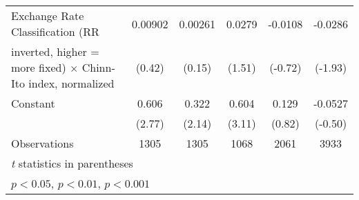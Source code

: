 \begin{table}[htbp]
\begin{tabular}{l*{5}{c}}
Exchange Rate Classification (RR        &  0.00902         &  0.00261         &   0.0279         &  -0.0108         &  -0.0286         \\
inverted, higher = more fixed) $\times$ Chinn-Ito index, normalized&   (0.42)         &   (0.15)         &   (1.51)         &  (-0.72)         &  (-1.93)         \\
\addlinespace
Constant                                &    0.606\sym{**} &    0.322\sym{*}  &    0.604\sym{**} &    0.129         &  -0.0527         \\
                                        &   (2.77)         &   (2.14)         &   (3.11)         &   (0.82)         &  (-0.50)         \\
\midrule
Observations                            &     1305         &     1305         &     1068         &     2061         &     3933         \\
\bottomrule
\multicolumn{6}{l}{\footnotesize \textit{t} statistics in parentheses}\\
\multicolumn{6}{l}{\footnotesize \sym{*} \(p<0.05\), \sym{**} \(p<0.01\), \sym{***} \(p<0.001\)}\\
\end{tabular}
\end{table}
